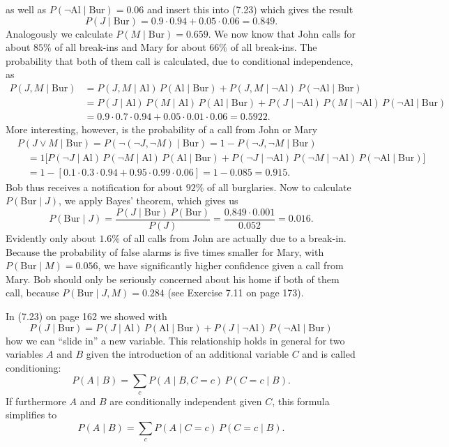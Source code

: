 \documentclass[10pt]{book}
\begin{document}
as well as $P(\neg \text{Al} \mid \text{Bur})=0.06$ and insert this into (7.23) which gives the result
$$
P(J \mid \text{Bur})=0.9 \cdot 0.94+0.05 \cdot 0.06=0.849 .
$$
Analogously we calculate $P(M \mid \text{Bur})=0.659$. We now know that John calls for about $85 \%$ of all break-ins and Mary for about $66 \%$ of all break-ins. The probability that both of them call is calculated, due to conditional independence, as
$$
\begin{aligned}
P(J,M \mid \text{Bur}) & =P(J,M \mid \text{Al})\,P(\text{Al} \mid \text{Bur})+P(J,M \mid \neg \text{Al})\,P(\neg \text{Al} \mid \text{Bur}) \\
& =P(J \mid \text{Al})\,P(M \mid \text{Al})\,P(\text{Al} \mid \text{Bur})+P(J \mid \neg \text{Al})\,P(M \mid \neg \text{Al})\,P(\neg \text{Al} \mid \text{Bur}) \\
& =0.9 \cdot 0.7 \cdot 0.94+0.05 \cdot 0.01 \cdot 0.06=0.5922 .
\end{aligned}
$$
More interesting, however, is the probability of a call from John or Mary
$$
\begin{aligned}
& P(J \vee M \mid \text{Bur})=P(\neg(\neg J,\neg M) \mid \text{Bur})=1-P(\neg J,\neg M \mid \text{Bur}) \\
& \quad=1\bigl[P(\neg J \mid \text{Al})\,P(\neg M \mid \text{Al})\,P(\text{Al} \mid \text{Bur})+P(\neg J \mid \neg \text{Al})\,P(\neg M \mid \neg \text{Al})\,P(\neg \text{Al} \mid \text{Bur})\bigr] \\
& \quad=1-[0.1 \cdot 0.3 \cdot 0.94+0.95 \cdot 0.99 \cdot 0.06]=1-0.085=0.915 .
\end{aligned}
$$
Bob thus receives a notification for about $92 \%$ of all burglaries. Now to calculate $P(\text{Bur} \mid J)$, we apply Bayes' theorem, which gives us
$$
P(\text{Bur} \mid J)=\frac{P(J \mid \text{Bur})\,P(\text{Bur})}{P(J)}=\frac{0.849 \cdot 0.001}{0.052}=0.016 .
$$
Evidently only about $1.6 \%$ of all calls from John are actually due to a break-in. Because the probability of false alarms is five times smaller for Mary, with $P(\text{Bur} \mid M)=0.056$, we have significantly higher confidence given a call from Mary. Bob should only be seriously concerned about his home if both of them call, because $P(\text{Bur} \mid J,M)=0.284$ (see Exercise 7.11 on page 173).

In (7.23) on page 162 we showed with
$$
P(J \mid \text{Bur})=P(J \mid \text{Al})\,P(\text{Al} \mid \text{Bur})+P(J \mid \neg \text{Al})\,P(\neg \text{Al} \mid \text{Bur})
$$
how we can “slide in” a new variable. This relationship holds in general for two variables $A$ and $B$ given the introduction of an additional variable $C$ and is called conditioning:
$$
P(A \mid B)=\sum_{c} P(A \mid B, C=c)\,P(C=c \mid B) .
$$
If furthermore $A$ and $B$ are conditionally independent given $C$, this formula simplifies to
$$
P(A \mid B)=\sum_{c} P(A \mid C=c)\,P(C=c \mid B) .
$$
\end{document}
